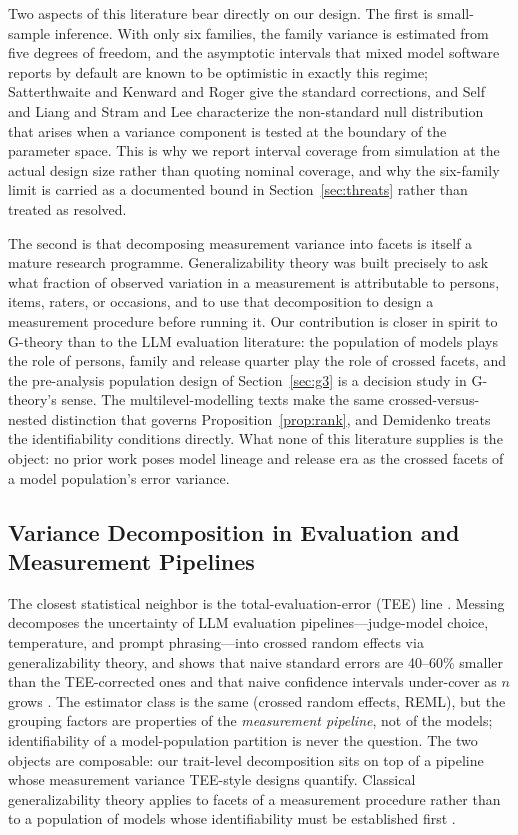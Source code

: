\documentclass{ieeeaccess}
\theoremstyle{definition}
\theoremstyle{plain}
\begin{document}
Two aspects of this literature bear directly on our design. The first is
small-sample inference. With only six families, the family variance is
estimated from five degrees of freedom, and the asymptotic intervals that mixed
model software reports by default are known to be optimistic in exactly this
regime; Satterthwaite \cite{satterthwaite1946} and Kenward and Roger
\cite{kenward1997} give the standard corrections, and Self and Liang
\cite{self1987} and Stram and Lee \cite{stram1994} characterize the
non-standard null distribution that arises when a variance component is tested
at the boundary of the parameter space. This is why we report interval coverage
from simulation at the actual design size rather than quoting nominal coverage,
and why the six-family limit is carried as a documented bound in
Section~\ref{sec:threats} rather than treated as resolved.

The second is that decomposing measurement variance into facets is itself a
mature research programme. Generalizability theory \cite{cronbach1972,
brennan2001} was built precisely to ask what fraction of observed variation in
a measurement is attributable to persons, items, raters, or occasions, and to
use that decomposition to design a measurement procedure before running it.
Our contribution is closer in spirit to G-theory than to the LLM evaluation
literature: the population of models plays the role of persons, family and
release quarter play the role of crossed facets, and the pre-analysis
population design of Section~\ref{sec:g3} is a decision study in G-theory's
sense. The multilevel-modelling texts \cite{snijders2012, gelman2007} make the
same crossed-versus-nested distinction that governs
Proposition~\ref{prop:rank}, and Demidenko \cite{demidenko2013} treats the
identifiability conditions directly. What none of this literature supplies is
the object: no prior work poses model lineage and release era as the crossed
facets of a model population's error variance.

\subsection{Variance Decomposition in Evaluation and Measurement Pipelines}
The closest statistical neighbor is the total-evaluation-error (TEE) line
\cite{messing2026,brennan2001}. Messing decomposes the uncertainty of LLM
evaluation pipelines---judge-model choice, temperature, and prompt phrasing---into
crossed random effects via generalizability theory, and shows that naive standard
errors are 40--60\% smaller than the TEE-corrected ones and that naive confidence
intervals under-cover as $n$ grows \cite{messing2026}. The estimator class is the
same (crossed random effects, REML), but the grouping factors are properties of
the \emph{measurement pipeline}, not of the models; identifiability of a
model-population partition is never the question. The two objects are composable:
our trait-level decomposition sits on top of a pipeline whose measurement variance
TEE-style designs quantify. Classical generalizability theory applies to facets of
a measurement procedure rather than to a population of models whose
identifiability must be established first \cite{brennan2001}.
\end{document}
